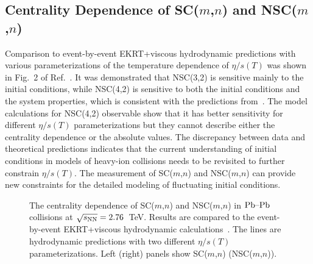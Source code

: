 \subsection{Centrality Dependence of SC($m$,$n$) and NSC($m$,$n$)}
\label{sec:theory_allorder}
Comparison to event-by-event EKRT+viscous hydrodynamic predictions with various parameterizations of the temperature dependence of $\eta/s(T)$ was shown in Fig.~2 of Ref.~\cite{ALICE:2016kpq}.
It was demonstrated that NSC(3,2) is sensitive mainly to the initial conditions, while NSC(4,2) is sensitive to both the initial conditions and the system properties, which is consistent with the predictions from~\cite{Niemi:2012aj}.
The model calculations for NSC(4,2) observable show that it has better sensitivity for different $\eta/s(T)$ parameterizations but they cannot
describe either the centrality dependence or the absolute values. The discrepancy between data and theoretical predictions indicates that the current understanding of initial conditions in models of heavy-ion collisions needs to be revisited to further constrain $\eta/s(T)$.
The measurement of SC($m$,$n$) and NSC($m$,$n$) can provide new constraints for the detailed modeling of fluctuating initial conditions.

\begin{figure}[t!]
            \begin{center}
              \end{center}
        \caption{The centrality dependence of SC($m$,$n$) and NSC($m$,$n$) in $\textnormal{Pb--Pb}$ collisions at $\sqrt{s_{\textnormal{NN}}}=2.76$~TeV. Results are compared to the event-by-event EKRT+viscous hydrodynamic calculations~\cite{Niemi:2015qia}. The lines are hydrodynamic predictions with two different $\eta/s(T)$ parameterizations. Left (right) panels show SC($m$,$n$) (NSC($m$,$n$)).}        
        \label{fig:Figure_4}
\end{figure}

